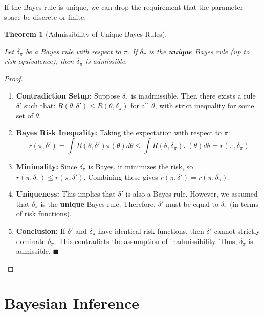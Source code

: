\documentclass[
  letterpaper,
  DIV=11,
  numbers=noendperiod]{scrreprt}
\renewcommand{\[}{\begin{equation}}
\renewcommand{\]}{\end{equation}}
\theoremstyle{definition}
\theoremstyle{plain}
\theoremstyle{plain}
\theoremstyle{plain}
\newtheorem{theorem}{Theorem}[chapter]
\theoremstyle{definition}
\theoremstyle{plain}
\theoremstyle{remark}
\begin{document}
If the Bayes rule is unique, we can drop the requirement that the
parameter space be discrete or finite.

\begin{theorem}[Admissibility of Unique Bayes
Rules]\protect\hypertarget{thm-admissibility-unique}{}\label{thm-admissibility-unique}

Let \(\delta_\pi\) be a Bayes rule with respect to \(\pi\). If
\(\delta_\pi\) is the \textbf{unique} Bayes rule (up to risk
equivalence), then \(\delta_\pi\) is admissible.

\end{theorem}

\begin{proof}
\leavevmode

\begin{enumerate}
\def\labelenumi{\arabic{enumi}.}
\item
  \textbf{Contradiction Setup:} Suppose \(\delta_\pi\) is inadmissible.
  Then there exists a rule \(\delta'\) such that:
  \(R(\theta, \delta') \le R(\theta, \delta_\pi)\) for all \(\theta\),
  with strict inequality for some set of \(\theta\).
\item
  \textbf{Bayes Risk Inequality:} Taking the expectation with respect to
  \(\pi\):
  \[r(\pi, \delta') = \int R(\theta, \delta') \pi(\theta) d\theta \le \int R(\theta, \delta_\pi) \pi(\theta) d\theta = r(\pi, \delta_\pi)\]
\item
  \textbf{Minimality:} Since \(\delta_\pi\) is Bayes, it minimizes the
  risk, so \(r(\pi, \delta_\pi) \le r(\pi, \delta')\). Combining these
  gives \(r(\pi, \delta') = r(\pi, \delta_\pi)\).
\item
  \textbf{Uniqueness:} This implies that \(\delta'\) is also a Bayes
  rule. However, we assumed that \(\delta_\pi\) is the \textbf{unique}
  Bayes rule. Therefore, \(\delta'\) must be equal to \(\delta_\pi\) (in
  terms of risk functions).
\item
  \textbf{Conclusion:} If \(\delta'\) and \(\delta_\pi\) have identical
  risk functions, then \(\delta'\) cannot strictly dominate
  \(\delta_\pi\). This contradicts the assumption of inadmissibility.
  Thus, \(\delta_\pi\) is admissible. \(\blacksquare\)
\end{enumerate}

\end{proof}


\chapter{Bayesian Inference}\label{bayesian-inference-1}
\end{document}
